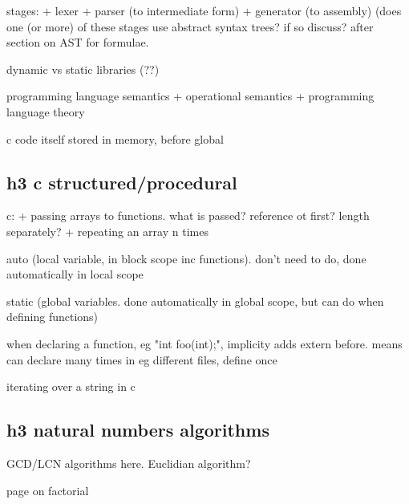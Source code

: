 stages:
+ lexer
+ parser (to intermediate form)
+ generator (to assembly)
(does one (or more) of these stages use abstract syntax trees? if so discuss? after section on AST for formulae.

dynamic vs static libraries (??)

programming language semantics
+ operational semantics
+ programming language theory

c code itself stored in memory, before global
\subsection{h3 c structured/procedural}

c:
+ passing arrays to functions. what is passed? reference ot first? length separately?
+ repeating an array n times

auto (local variable, in block scope inc functions). don't need to do, done automatically in local scope

static (global variables. done automatically in global scope, but can do when defining functions)

when declaring a function, eg "int foo(int);", implicity adds extern before. means can declare many times in eg different files, define once

iterating over a string in c
\subsection{h3 natural numbers algorithms}

GCD/LCN algorithms here. Euclidian algorithm?

page on factorial

